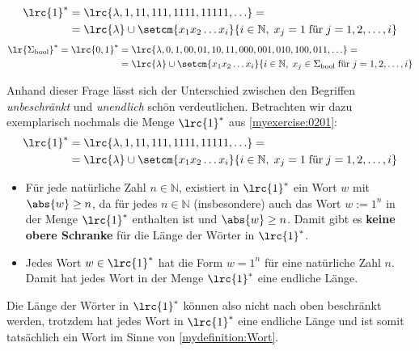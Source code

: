 \begin{myanswer}[myexercise:0201]
	\begin{align*}
		\lrc{1}^* & = \lrc{\lambda, 1, 11, 111, 1111, 11111, \ldots } =                                                       \\
		          & = \lrc{\lambda}\cup \setcm{x_1x_2\ldots  x_i}{i\in\mathbb{N},\; x_j = 1\;\text{für}\; j = 1,2,\ldots , i}
	\end{align*}
	\begin{align*}
		\lr{\Sigma_{\text{bool}}}^* = \lrc{0,1}^* & = \lrc{\lambda, 0, 1, 00, 01, 10, 11, 000, 001, 010, 100, 011, \ldots } =                                                     \\
		                                          & = \lrc{\lambda}\cup \setcm{x_1x_2\ldots  x_i}{i\in\mathbb{N},\; x_j\in\Sigma_{\text{bool}} \;\text{für}\; j = 1,2,\ldots , i}
	\end{align*}
\end{myanswer}

\begin{myanswer}[myexercise:0202]
	Anhand dieser Frage lässt sich der Unterschied zwischen den Begriffen \textit{unbeschränkt} und \textit{unendlich} schön verdeutlichen. Betrachten wir dazu exemplarisch nochmals die Menge $\lrc{1}^*$ aus \cref{myexercise:0201}:
	\begin{align*}
		\lrc{1}^* & = \lrc{\lambda, 1, 11, 111, 1111, 11111, \ldots } =                                                      \\
		          & = \lrc{\lambda}\cup \setcm{x_1x_2\ldots x_i}{i\in\mathbb{N},\; x_j = 1\;\text{für}\; j = 1,2,\ldots , i}
	\end{align*}
	\begin{itemize}
		\item Für jede natürliche Zahl $n\in\mathbb{N}$, existiert in $\lrc{1}^*$ ein Wort $w$ mit $\abs{w} \geq n$, da für jedes $n\in\mathbb{N}$ (insbesondere) auch das Wort $w:=1^n$ in der Menge $\lrc{1}^*$ enthalten ist und $\abs{w}\geq n$. Damit gibt es \textbf{keine obere Schranke} für die Länge der Wörter in $\lrc{1}^*$.
		\item Jedes Wort $w\in\lrc{1}^*$ hat die Form $w = 1^n$ für eine natürliche Zahl $n$. Damit hat jedes Wort in der Menge $\lrc{1}^*$ eine endliche Länge.
	\end{itemize}
	Die Länge der Wörter in $\lrc{1}^*$ können also nicht nach oben beschränkt werden, trotzdem hat jedes Wort in $\lrc{1}^*$ eine endliche Länge und ist somit tatsächlich ein Wort im Sinne von \cref{mydefinition:Wort}.
\end{myanswer}

